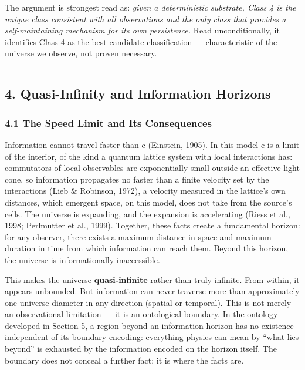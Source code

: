 \documentclass[
]{article}
\begin{document}
The argument is strongest read as: \emph{given a deterministic
substrate, Class 4 is the unique class consistent with all observations
and the only class that provides a self-maintaining mechanism for its
own persistence.} Read unconditionally, it identifies Class 4 as the
best candidate classification --- characteristic of the universe we
observe, not proven necessary.

\begin{center}\rule{0.5\linewidth}{0.5pt}\end{center}

\hypertarget{quasi-infinity-and-information-horizons}{%
\subsection{4. Quasi-Infinity and Information
Horizons}\label{quasi-infinity-and-information-horizons}}

\hypertarget{the-speed-limit-and-its-consequences}{%
\subsubsection{4.1 The Speed Limit and Its
Consequences}\label{the-speed-limit-and-its-consequences}}

Information cannot travel faster than c (Einstein, 1905). In this model
c is a limit of the interior, of the kind a quantum lattice system with
local interactions has: commutators of local observables are
exponentially small outside an effective light cone, so information
propagates no faster than a finite velocity set by the interactions
(Lieb \& Robinson, 1972), a velocity measured in the lattice's own
distances, which emergent space, on this model, does not take from the
source's cells. The universe is expanding, and the expansion is
accelerating (Riess et al., 1998; Perlmutter et al., 1999). Together,
these facts create a fundamental horizon: for any observer, there exists
a maximum distance in space and maximum duration in time from which
information can reach them. Beyond this horizon, the universe is
informationally inaccessible.

This makes the universe \textbf{quasi-infinite} rather than truly
infinite. From within, it appears unbounded. But information can never
traverse more than approximately one universe-diameter in any direction
(spatial or temporal). This is not merely an observational limitation
--- it is an ontological boundary. In the ontology developed in Section
5, a region beyond an information horizon has no existence independent
of its boundary encoding: everything physics can mean by ``what lies
beyond'' is exhausted by the information encoded on the horizon itself.
The boundary does not conceal a further fact; it is where the facts are.
\end{document}

